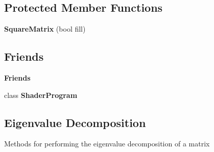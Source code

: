 \subsection*{Protected Member Functions}
\begin{DoxyCompactItemize}
\item 
\mbox{\label{classrev_1_1_square_matrix_a614dd425ca50d644003b0002dde42044}} 
{\bfseries Square\+Matrix} (bool fill)
\end{DoxyCompactItemize}
\subsection*{Friends}
\begin{Indent}\textbf{ Friends}\par
\begin{DoxyCompactItemize}
\item 
\mbox{\label{classrev_1_1_square_matrix_aef20119bde6aff11ffd23f3ea2131b86}} 
class {\bfseries Shader\+Program}
\end{DoxyCompactItemize}
\end{Indent}
\subsection*{Eigenvalue Decomposition}
\label{_amgrpa08248e2cb40a60980ed03befc65a4b2}%
Methods for performing the eigenvalue decomposition of a matrix


